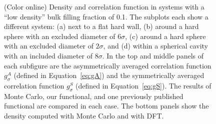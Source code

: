 \documentclass[letterpaper,twocolumn,amsmath,amssymb,pre]{revtex4-1}
\begin{document}
\begin{figure}
  \caption{ (Color online) Density and correlation function in systems
    with a ``low density'' bulk filling fraction of 0.1.  The
    subplots each show a different system: (a) next to a flat hard wall, (b)
    around a hard sphere with an excluded diameter of $6\sigma$, (c)
    around a hard sphere with an excluded diameter of $2\sigma$, and
    (d) within a spherical cavity with an included diameter of $8\sigma$.
    In the top and middle panels of each subfigure are the
    asymmetrically averaged correlation function $g_\sigma^A$ (defined
    in Equation~\ref{eq:gA}) and the symmetrically averaged
    correlation function $g_\sigma^S$ (defined in
    Equation~\ref{eq:gS}).  The results of Monte Carlo, our
    functional, and one previously published
    functional\cite{gross2009density,
      yu2002fmt-dft-inhomogeneous-associating} are compared in each
    case.  The bottom panels show the density computed with
    Monte Carlo and with DFT.}
  \label{fig:low-density}
\end{figure}
\end{document}
